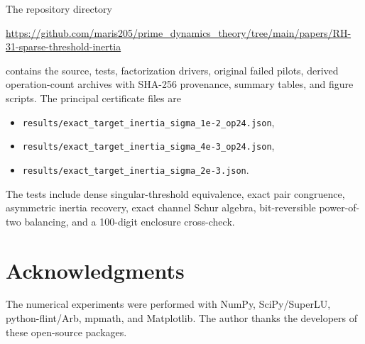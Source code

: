 \documentclass[11pt]{article}
\theoremstyle{definition}
\theoremstyle{remark}
\begin{document}
The repository directory
\begin{center}
\url{https://github.com/maris205/prime_dynamics_theory/tree/main/papers/RH-31-sparse-threshold-inertia}
\end{center}
contains the source, tests, factorization drivers, original failed pilots,
derived operation-count archives with SHA-256 provenance, summary tables,
and figure scripts.  The principal certificate files are
\begin{itemize}
 \item \texttt{results/exact\_target\_inertia\_sigma\_1e-2\_op24.json},
 \item \texttt{results/exact\_target\_inertia\_sigma\_4e-3\_op24.json},
 \item \texttt{results/exact\_target\_inertia\_sigma\_2e-3.json}.
\end{itemize}
The tests include dense singular-threshold equivalence, exact pair
congruence, asymmetric inertia recovery, exact channel Schur algebra,
bit-reversible power-of-two balancing, and a 100-digit enclosure cross-check.

\section*{Acknowledgments}

The numerical experiments were performed with NumPy, SciPy/SuperLU,
python-flint/Arb, mpmath, and Matplotlib.  The author thanks the developers of
these open-source packages.



\end{document}
